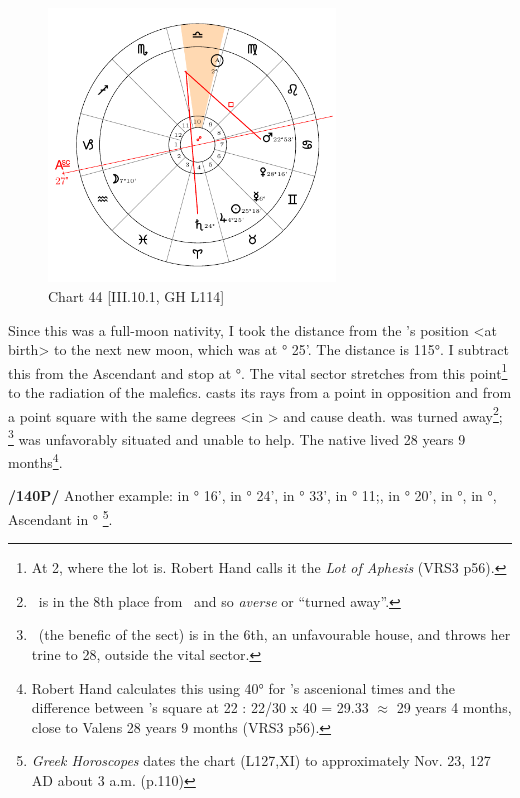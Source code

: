 \clearpage
\begin{figure}
\centering
\vspace{-20pt}
\includegraphics[width=0.68\textwidth]{charts/3_10_1}
\caption{Chart 44 [III.10.1, GH L114]}
\label{fig:chart44}
\end{figure} 

Since this was a full-moon nativity, I took the distance from the \Moon’s position <at birth> to the next new moon, which was at \Gemini\xspace 2° 25'. The distance is 115°. I subtract this from the Ascendant and stop at \Libra\xspace 2°. The vital sector stretches from this point\footnote{At 2\Libra, where the lot is. Robert Hand calls it the \textsl{Lot of Aphesis} (VRS3 p56).} to the radiation of the malefics. \Saturn\xspace casts its rays from a point in opposition and \Mars\xspace from a point square with the same degrees <in \Libra> and cause death. \Jupiter\xspace was turned away\footnote{\Jupiter\, is in the 8th place from \Libra\, and so \textsl{averse} or ``turned away''.}; \Venus\,\footnote{ \Venus\, (the benefic of the sect) is in the 6th, an unfavourable house, and throws her trine to 28\Libra, outside the vital sector.} was unfavorably situated and unable to help. The native lived 28 years 9 months\footnote{Robert Hand calculates this using 40° for \Libra's ascenional times and the difference between \Mars's square at 22 \Libra: 22/30 x 40 = 29.33 $\approx$ 29 years 4 months, close to Valens 28 years 9 months (VRS3 p56). }.

\newpage
\textbf{/140P/} Another example: \Sun\xspace in \Sagittarius\xspace 12° 16', \Moon\xspace in \Sagittarius\xspace 17° 24', \Saturn\xspace in \Libra\xspace 11° 33', \Jupiter\xspace in \Gemini\xspace 19° 11;, \Mars\xspace in \Scorpio\xspace 4° 20', \Venus\xspace in \Libra\xspace 26°, \Mercury\xspace in \Scorpio\xspace 27°,
Ascendant in \Libra\xspace 20°
\footnote{\textit{Greek Horoscopes} dates the chart (L127,XI) to approximately Nov. 23, 127 AD about 3 a.m. (p.110)}.

